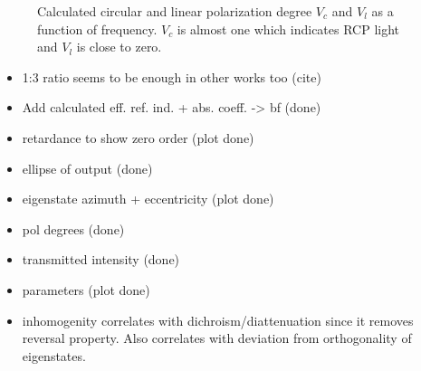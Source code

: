 \begin{figure}[H]
    \centering
    
    \caption{Calculated circular and linear polarization degree $V_c$ and $V_l$ as a function of frequency. $V_c$ is almost one which indicates RCP light and $V_l$ is close to zero.}
    \label{fig:polymer_pol_deg}
\end{figure}

\begin{figure}[H]
    \centering
    
    \caption{}
    \label{fig:polymer_ret_and_diat}
\end{figure}

\begin{figure}[H]
    \centering
    
    \caption{}
    \label{fig:polymer_params_dotted}
\end{figure}

\begin{figure}[H]
    \centering
    
    \caption{}
    \label{fig:polymer_eigenstate_params}
\end{figure}

\begin{itemize}
    \item 1:3 ratio seems to be enough in other works too (cite)
    \item Add calculated eff. ref. ind. + abs. coeff. -> bf (done)
    \item retardance to show zero order (plot done)
    \item ellipse of output (done)
    \item eigenstate azimuth + eccentricity (plot done)
    \item pol degrees (done)
    \item transmitted intensity (done)
    \item parameters (plot done)
    \item inhomogenity correlates with dichroism/diattenuation since it removes reversal property. Also correlates with deviation from orthogonality of eigenstates. 
\end{itemize}


